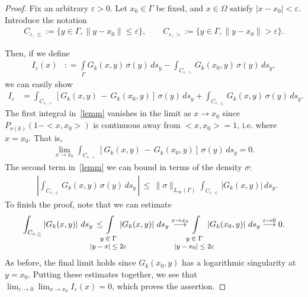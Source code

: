 \documentclass[final]{siamltex}
\newcommand{\e}{\varepsilon}
\begin{document}
\begin{proof}
Fix an arbitrary $\varepsilon > 0$. Let $x_0 \in \Gamma$ be fixed, and
$x \in \Omega$ satisfy $|x-x_0| < \varepsilon$.  Introduce the notation 
\begin{align*}
  C_{\e,\leq}:=\{y \in \Gamma,\|y-x_0\|\leq\e\},\qquad  
  C_{\e,>}:=\{y\in \Gamma,\|y-x_0\|>\e\}.
\end{align*}

Then, if we define
\begin{align*}
I_{\varepsilon}(x) &: = \int\limits_\Gamma G_k(x,y)\,\sigma(y) \,ds_{y} 
 - \int_{C_{\e,>}} G_k(x_0,y)\,\sigma(y)\,ds_{y},
 \end{align*} 
we can easily show
\begin{align}
  I_{\varepsilon}& =  \int_{C_{\e,>}}
  \left[ G_k(x,y)\,-\, G_k(x_0,y) \right]\,\sigma(y)\,ds_{y} +    
    \int_{C_{\e,\leq}} G_k(x,y)\, \sigma(y)\, ds_{y}.
  \label{lemm}
\end{align}
The first integral in~\eqref{lemm} vanishes in the limit as
$x\rightarrow x_0$ since $P_{\nu(k)}(1-<x,x_0>)$ is continuous
away from $<x,x_0>=1$, i.e. where $x=x_0$.  That is, 
\begin{align*}
\lim\limits_{x \to x_0}
\int_{C_{\e,>}}
\left[G_k(x,y)\,-\,G_k(x_0,y) \right]\,\sigma(y)\,ds_{y} = 0 .
\end{align*}
The second term in~\eqref{lemm} we can bound in terms of the density
$\sigma$:
\begin{align*}
 &\left|\int_{C_{\e,\leq}}
G_k(x,y)\,\sigma(y)\,ds_{y}\,\right| \, \leq \,
\| \sigma \|_{L_\infty(\Gamma)} \int_{C_{\e,\leq}}
\left| G_k(x,y)\right|\,ds_{y}.
\end{align*}
To finish the proof, note that we can estimate
\begin{align*} \int_{C_{\e,\leq}}
\left| G_k(x,y)\right|\,ds_{y}\,\leq\,
\hspace*{-8mm} \int\limits_{\footnotesize
\begin{array}{c}y \in \Gamma \\ |y-x| \leq 2\varepsilon\end{array}} \hspace*{-6mm}
\left| G_k(x,y)\right|\,ds_{y}
\buildrel {x\rightarrow x_{0}}\over\longrightarrow 
\hspace*{-8mm} \int\limits_{\footnotesize
\begin{array}{c}y \in \Gamma \\|y-x_0| \leq 2\varepsilon\end{array}} \hspace*{-6mm}
\left| G_k(x_0,y)\right|\,ds_{y}
\buildrel{\varepsilon\rightarrow 0}\over\longrightarrow 0.
\end{align*}
As before, the final limit holds since $G_{k}(x_{0},y)$ has a
logarithmic singularity at $y = x_{0}$.  Putting these estimates
together, we see that  $\displaystyle \lim_{\varepsilon\rightarrow
0}\lim_{x\rightarrow x_{0}} I_{\varepsilon}(x)=0$, which proves the
assertion.
\end{proof}
\end{document}
